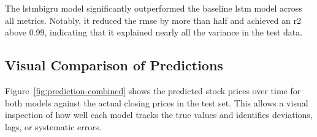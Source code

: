 The \acrshort{lstmbigru} model significantly outperformed the baseline \acrshort{lstm} model across all
metrics. Notably, it reduced the \acrshort{rmse} by more than half and achieved an \acrshort{r2} above 0.99, indicating that it explained nearly all the variance in the test data.

\subsection{Visual Comparison of Predictions}

Figure~\ref{fig:prediction-combined} shows the predicted stock prices over time for both models against the actual closing prices in the test set. This allows a visual inspection of how well each model tracks the true values and identifies deviations, lags, or systematic errors.

